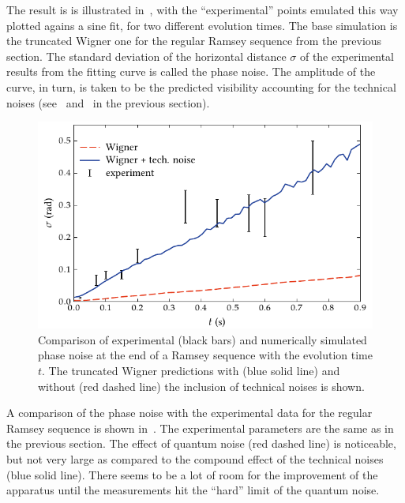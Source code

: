 The result is is illustrated in~, with the ``experimental'' points emulated this way plotted agains a sine fit, for two different evolution times.
The base simulation is the truncated Wigner one for the regular Ramsey sequence from the previous section.
The standard deviation of the horizontal distance $\sigma$ of the experimental results from the fitting curve is called the phase noise.
The amplitude of the curve, in turn, is taken to be the predicted visibility accounting for the technical noises (see~ and~ in the previous section).

\begin{figure}
    \centerline{\includegraphics{figures_generated/bec_noise/ramsey_noise.pdf}}

    \caption{Comparison of experimental (black bars) and numerically simulated phase noise at the end of a Ramsey sequence with the evolution time $t$.
    The truncated Wigner predictions with (blue solid line) and without (red dashed line) the inclusion of technical noises is shown.}%

    \label{fig:bec-noise:phase-noise:ramsey-phnoise}
\end{figure}

A comparison of the phase noise with the experimental data for the regular Ramsey sequence is shown in~.
The experimental parameters are the same as in the previous section.
The effect of quantum noise (red dashed line) is noticeable, but not very large as compared to the compound effect of the technical noises (blue solid line).
There seems to be a lot of room for the improvement of the apparatus until the measurements hit the ``hard'' limit of the quantum noise.


